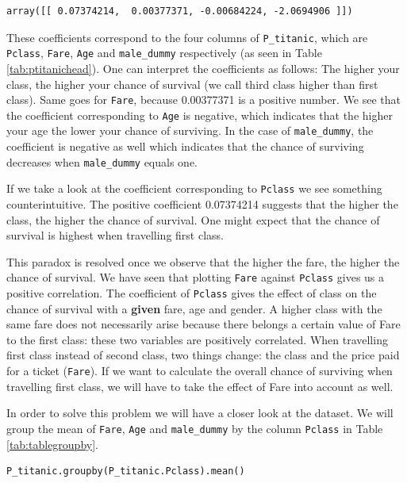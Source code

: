 \documentclass[11pt]{article}
\begin{document}
\begin{verbatim}
array([[ 0.07374214,  0.00377371, -0.00684224, -2.0694906 ]])
\end{verbatim}


These coefficients correspond to the four columns of  \texttt{P\_titanic}, which are \texttt{Pclass}, \texttt{Fare}, \texttt{Age} and \texttt{male\_dummy} respectively (as seen in Table \ref{tab:ptitanichead}). One can interpret the coefficients as follows: The higher your class, the higher your chance of survival (we call third class higher than first class). Same goes for \texttt{Fare}, because 0.00377371 is a positive number. We see that the coefficient corresponding to \texttt{Age} is negative, which indicates that the higher your age the lower your chance of surviving. In the case of \texttt{male\_dummy}, the coefficient is negative as well which indicates that the chance of surviving decreases when \texttt{male\_dummy} equals one. 

If we take a look at the coefficient corresponding to \texttt{Pclass} we see something counterintuitive. The positive coefficient 0.07374214 suggests that the higher the class, the higher the chance of survival. One might expect that the chance of survival is highest when travelling first class.

This paradox is resolved once we observe that the higher the fare, the higher the chance of survival. We have seen that plotting \texttt{Fare} against \texttt{Pclass} gives us a positive correlation. The coefficient of \texttt{Pclass} gives the effect of class on the chance of survival with a \textbf{given} fare, age and gender. A higher class with the same fare does not necessarily arise because there belongs a certain value of Fare to the first class: these two variables are positively correlated. When travelling first class instead of second class, two things change: the class and the price paid for a ticket (\texttt{Fare}). If we want to calculate the overall chance of surviving when travelling first class, we will have to take the effect of Fare into account as well.  

In order to solve this problem we will have a closer look at the dataset. We will group the mean of  \texttt{Fare}, \texttt{Age} and \texttt{male\_dummy} by the column \texttt{Pclass} in Table \ref{tab:tablegroupby}. 

\begin{verbatim}
P_titanic.groupby(P_titanic.Pclass).mean()
\end{verbatim}
\end{document}
